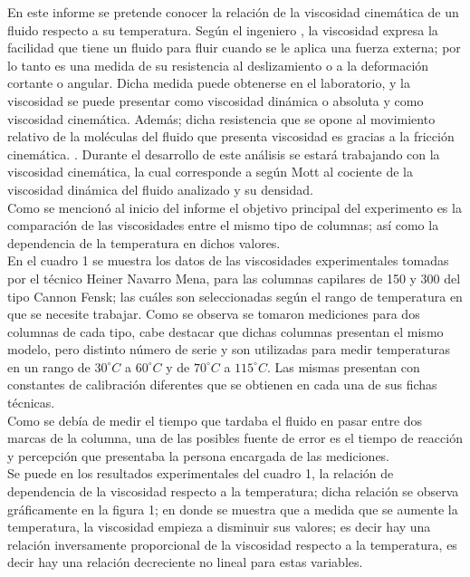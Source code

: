 \documentclass[12, letterpaper]{article}
\begin{document}
En este informe se pretende conocer la relación de la viscosidad cinemática de un fluido respecto a su temperatura. Según el ingeniero \cite{marcano}, la viscosidad  expresa la facilidad que tiene un fluido para fluir cuando se le aplica una fuerza externa; por lo tanto es una medida de su resistencia al deslizamiento o a la deformación cortante o angular.  Dicha medida puede obtenerse en el laboratorio, y la viscosidad se puede presentar como viscosidad dinámica o absoluta y como  viscosidad cinemática. Además; dicha resistencia que se opone al movimiento relativo de la moléculas del fluido que presenta viscosidad es gracias a la fricción cinemática. \cite{mott}. Durante el desarrollo de este análisis se estará trabajando con la viscosidad cinemática, la cual corresponde a según Mott al cociente de la viscosidad dinámica del fluido analizado y su densidad.\\
Como se mencionó al inicio del informe el objetivo principal del experimento es la comparación de las viscosidades entre el mismo tipo de columnas; así como la dependencia de la temperatura en dichos valores.\\ 
En el cuadro 1 se muestra los datos de las viscosidades experimentales tomadas por el técnico Heiner Navarro Mena, para las columnas capilares de 150 y 300 del tipo Cannon Fensk; las cuáles son seleccionadas según el rango de temperatura en que se necesite trabajar. Como se observa se tomaron mediciones para dos columnas de cada tipo, cabe destacar que dichas columnas presentan el mismo modelo, pero distinto número de serie y son utilizadas para medir temperaturas en un rango de $30^{\circ}C$ a $60^{\circ}C$ y de $70^{\circ}C$ a $115^{\circ}C$. Las mismas presentan con constantes de calibración diferentes que se obtienen en cada una de sus fichas técnicas.\\ 
Como se debía de medir el tiempo que tardaba el fluido en pasar entre dos marcas de la columna, una de las posibles fuente de error es el tiempo de reacción y percepción que presentaba la persona encargada de las mediciones.\\
Se puede en los resultados experimentales del cuadro 1, la relación de dependencia de la viscosidad respecto a la temperatura; dicha relación se observa gráficamente en la figura 1; en donde se muestra que a medida que se aumente la temperatura, la viscosidad empieza a disminuir sus valores; es decir hay una relación inversamente proporcional de la viscosidad respecto a la temperatura, es decir hay una relación decreciente no lineal para estas variables.\\
\end{document}
